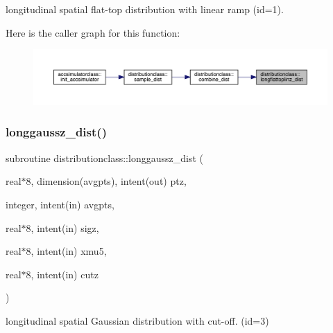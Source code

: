 longitudinal spatial flat-\/top distribution with linear ramp (id=1). 

Here is the caller graph for this function\+:\nopagebreak
\begin{figure}[H]
\begin{center}
\leavevmode
\includegraphics[width=350pt]{namespacedistributionclass_a00926191e33371dc32c2fdbaca1ee2a5_icgraph}
\end{center}
\end{figure}
\mbox{\label{namespacedistributionclass_ab34be02e18a0166b3b2c945e0f68b9ca}} 
\subsubsection{\texorpdfstring{longgaussz\_dist()}{longgaussz\_dist()}}
{\footnotesize\ttfamily subroutine distributionclass\+::longgaussz\+\_\+dist (\begin{DoxyParamCaption}\item[{real$\ast$8, dimension(avgpts), intent(out)}]{ptz,  }\item[{integer, intent(in)}]{avgpts,  }\item[{real$\ast$8, intent(in)}]{sigz,  }\item[{real$\ast$8, intent(in)}]{xmu5,  }\item[{real$\ast$8, intent(in)}]{cutz }\end{DoxyParamCaption})}



longitudinal spatial Gaussian distribution with cut-\/off. (id=3) 

